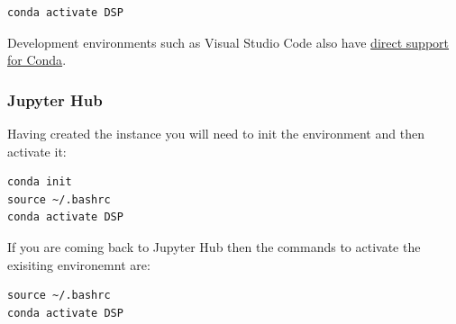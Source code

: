 \begin{verbatim}
conda activate DSP
\end{verbatim}

Development environments such as Visual Studio Code also have
\href{https://code.visualstudio.com/docs/python/environments}{direct
	support}
\href{https://www.anaconda.com/docs/tools/working-with-conda/ide-tutorials/vscode}{for
	Conda}.

\subsubsection{Jupyter Hub}

Having created the instance you will need to init the environment and
then activate it:

\begin{verbatim}
conda init
source ~/.bashrc
conda activate DSP
\end{verbatim}

If you are coming back to Jupyter Hub then the commands to activate the
exisiting environemnt are:

\begin{verbatim}
source ~/.bashrc
conda activate DSP
\end{verbatim}

